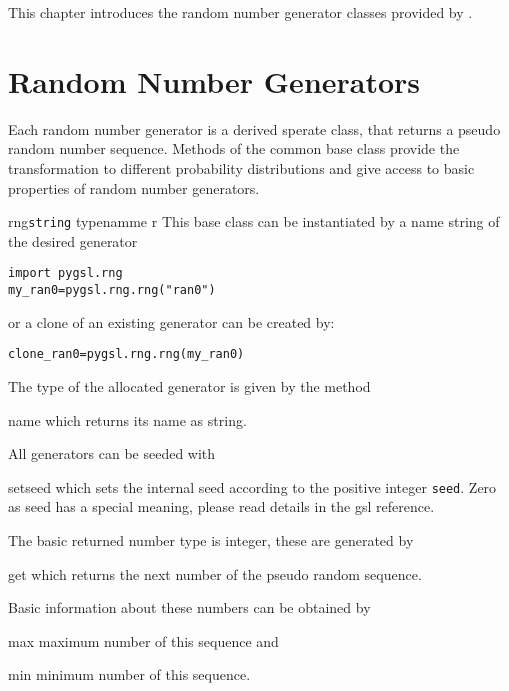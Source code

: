 

This chapter introduces the random number generator classes provided by .

\section{Random Number Generators}

Each random number generator is a derived sperate class, that returns
a pseudo random number sequence. Methods of the common base class 
provide the transformation to different probability distributions and
give access to basic properties of random number generators.
\begin{classdesc}{rng}{\texttt{string} typenamme \code{|}  r}
This base class can be instantiated by a name string of the desired generator
\begin{verbatim}
import pygsl.rng
my_ran0=pygsl.rng.rng("ran0")
\end{verbatim}
or a clone of an existing generator can be created by:
\begin{verbatim}
clone_ran0=pygsl.rng.rng(my_ran0)
\end{verbatim}
\end{classdesc}
The type of the allocated generator is given by the method
\begin{methoddesc}{name}{}
which returns its name as string.
\end{methoddesc}
All generators can be seeded with
\begin{methoddesc}{set}{seed}
which sets the internal seed according to the positive integer {\tt seed}. Zero as seed
has a special meaning, please read details in the gsl reference.
\end{methoddesc}
The basic returned number type is integer, these are generated by
\begin{methoddesc}{get}{}
which returns the next number of the pseudo random sequence.
\end{methoddesc}
Basic information about these numbers can be obtained by
\begin{methoddesc}{max}{}
maximum number of this sequence and
\end{methoddesc}
\begin{methoddesc}{min}{}
minimum number of this sequence.
\end{methoddesc}
